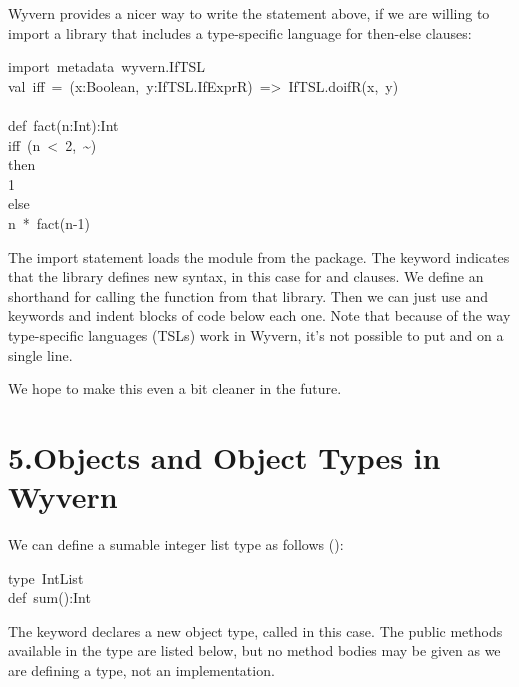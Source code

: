 \documentclass{article}
\begin{document}
Wyvern provides a nicer way to write the  statement above, if we
are willing to import a library that includes a type-specific language
for then-else clauses:%
\begin{mdpre}%
\noindent import~metadata~wyvern.IfTSL\\
val~iff~=~(x:Boolean,~y:IfTSL.IfExprR)~=\textgreater{}~IfTSL.doifR(x,~y)\\
\\
def~fact(n:Int):Int\\
iff~(n~\textless{}~2,~\textasciitilde{})\\
then\\
1\\
else\\
n~*~fact(n-1)%
\end{mdpre}\noindent{}The import statement loads the  module from the  package.
The  keyword indicates that the library defines new syntax,
in this case for  and  clauses.  We define an  shorthand
for calling the  function from that library.  Then we can just use
 and  keywords and indent blocks of code below each one.  Note
that because of the way type-specific languages (TSLs) work in Wyvern, it's
not possible to put  and  on a single line.

We hope to make this even a bit cleaner in the future.

\section{5.\hspace*{0.5em}Objects and Object Types in Wyvern}\label{sec-objects-and-object-types-in-wyvern}%

\noindent{}We can define a sumable integer list type as follows ():%
\begin{mdpre}%
\noindent type~IntList\\
def~sum():Int%
\end{mdpre}\noindent{}The  keyword declares a new object type, called  in
this case.  The public methods available in the type are listed below,
but no method bodies may be given as we are defining a type, not an
implementation.
\end{document}
